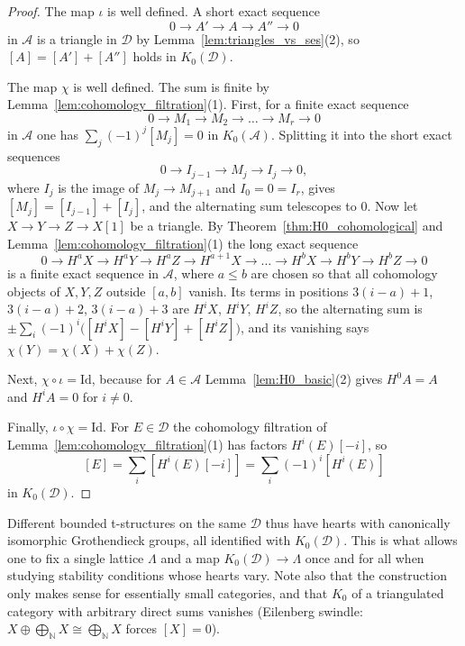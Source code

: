 \documentclass[12pt]{amsart}
\newenvironment{remark}{{\textbf{Remark.}}}
\numberwithin{theorem}{section}
\theoremstyle{definition}
\newcommand{\calA}{\mathcal{A}}
\newcommand{\id}{\mathrm{Id}}
\newcommand{\Kgroup}{K_0}
\newcommand{\calD}{\mathcal{D}}
\newcommand{\NN}{\mathbb{N}}
\begin{document}
	\begin{proof}
		The map $\iota$ is well defined.
		A short exact sequence 
		\[
		0 \to A' \to A \to A'' \to 0
		\] 
		in $\calA$ is a triangle in $\calD$ by Lemma~\ref{lem:triangles_vs_ses}(2), so $[A] = [A'] + [A'']$ holds in $\Kgroup(\calD)$.
		
		The map $\chi$ is well defined.
		The sum is finite by Lemma~\ref{lem:cohomology_filtration}(1).
		First, for a finite exact sequence 
		\[0 \to M_1 \to M_2 \to \ldots \to M_r \to 0\] 
		in $\calA$ one has $\sum_j (-1)^j [M_j] = 0$ in $\Kgroup(\calA)$.
		Splitting it into the short exact sequences
		\[
		0 \to I_{j-1} \to M_j \to I_j \to 0 ,
		\]
		where $I_j$ is the image of $M_j \to M_{j+1}$ and $I_0 = 0 = I_r$, gives $[M_j] = [I_{j-1}] + [I_j]$, and the alternating sum telescopes to $0$.
		Now let $X \to Y \to Z \to X[1]$ be a triangle.
		By Theorem~\ref{thm:H0_cohomological} and Lemma~\ref{lem:cohomology_filtration}(1) the long exact sequence
		\[
		0 \to H^{a} X \to H^{a} Y \to H^{a} Z \to H^{a+1} X \to \ldots \to H^{b} X \to H^{b} Y \to H^{b} Z \to 0
		\]
		is a finite exact sequence in $\calA$, where $a \leqslant b$ are chosen so that all cohomology objects of $X, Y, Z$ outside $[a, b]$ vanish.
		Its terms in positions $3(i - a) + 1$, $3(i - a) + 2$, $3(i - a) + 3$ are $H^i X$, $H^i Y$, $H^i Z$, so the alternating sum is $\pm \sum_i (-1)^{i} \big( [H^i X] - [H^i Y] + [H^i Z] \big)$, and its vanishing says $\chi(Y) = \chi(X) + \chi(Z)$.
		
		Next, $\chi \circ \iota = \id$, because for $A \in \calA$ Lemma~\ref{lem:H0_basic}(2) gives $H^0 A = A$ and $H^i A = 0$ for $i \neq 0$.
		
		Finally, $\iota \circ \chi = \id$.
		For $E \in \calD$ the cohomology filtration of Lemma~\ref{lem:cohomology_filtration}(1) has factors $H^i(E)[-i]$, so
		\[
		[E] = \sum_i [H^i(E)[-i]] = \sum_i (-1)^i [H^i(E)]
		\]
		in $\Kgroup(\calD)$.
	\end{proof}
	
	\begin{remark}
		Different bounded t-structures on the same $\calD$ thus have hearts with canonically isomorphic Grothendieck groups, all identified with $\Kgroup(\calD)$.
		This is what allows one to fix a single lattice $\Lambda$ and a map $\Kgroup(\calD) \to \Lambda$ once and for all when studying stability conditions whose hearts vary.
		Note also that the construction only makes sense for essentially small categories, and that $\Kgroup$ of a triangulated category with arbitrary direct sums vanishes (Eilenberg swindle: $X \oplus \bigoplus_{\NN} X \cong \bigoplus_{\NN} X$ forces $[X] = 0$).
	\end{remark}
	
\end{document}
